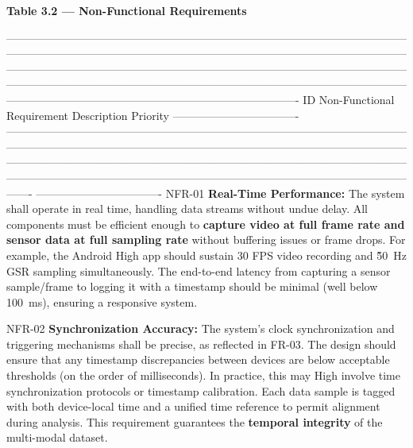 \textbf{Table 3.2 --- Non-Functional Requirements}

  -------------------------------------------------------------------------------------------------------------------------------------------------------------------------------------------------------------------------------------------------------------------------------------------------------------------------------------------------------------------------------------------------------------------------------------------------------------------------------------------------------------------------------
  ID                      Non-Functional Requirement Description                                                                                                                                                                                                                                                                Priority
  ---------------------------------- ------------------------------------------------------------------------------------------------------------------------------------------------------------------------------------------------------------------------------------------------------------------------------------------------------------------------------------------------------------------------------------------------------------------------------------------------------- ----------------------------------
  NFR-01                  \textbf{Real-Time Performance:} The system shall operate in real time, handling data streams without undue delay. All components must be efficient enough to \textbf{capture video at full frame rate and sensor data at full sampling rate} without buffering issues or frame drops. For example, the Android  High
                          app should sustain 30 FPS video recording and \~50 Hz GSR sampling simultaneously. The end-to-end latency from capturing a sensor sample/frame to logging it with a timestamp should be minimal (well below 100 ms), ensuring a responsive system.                                                    

  NFR-02                  \textbf{Synchronization Accuracy:} The system's clock synchronization and triggering mechanisms shall be precise, as reflected in FR-03. The design should ensure that any timestamp discrepancies between devices are below acceptable thresholds (on the order of milliseconds). In practice, this may   High
                          involve time synchronization protocols or timestamp calibration. Each data sample is tagged with both device-local time and a unified time reference to permit alignment during                                                                                                                       
                          analysis\cite{ref12}. This requirement guarantees the \textbf{temporal integrity} of the multi-modal dataset.                                                                       

